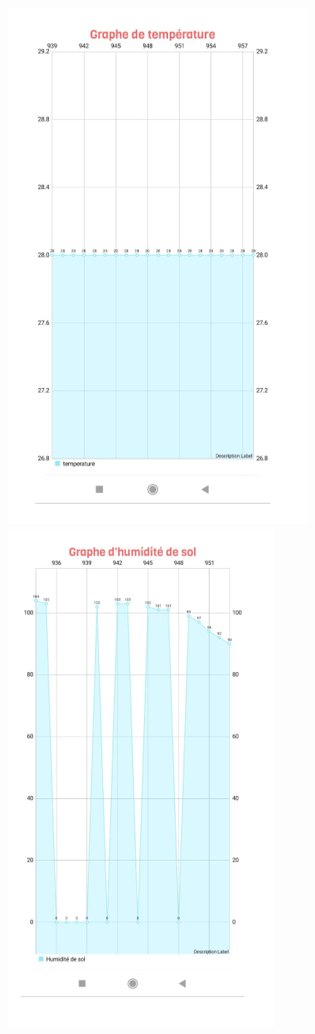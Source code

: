 \begin{flushleft}
\begin{figure}[h]
		\includegraphics{chapitres/images/fenetre3.PNG}
		\includegraphics{chapitres/images/fenetre4.PNG}
		
	\end{figure}
	\begin{figure}[h]
		\centering
		

\end{figure}
\end{flushleft}
